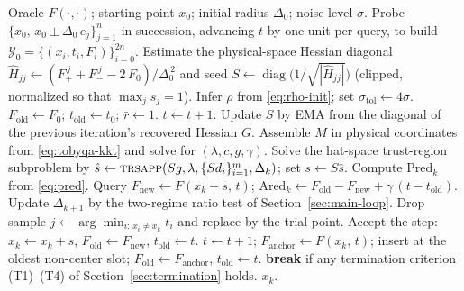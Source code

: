 \documentclass[11pt,a4paper]{article}
\begin{document}
\begin{algorithm}[t]
\caption{TOBYQA}
\label{alg:tobyqa}
\begin{algorithmic}[1]
\REQUIRE Oracle $F(\cdot,\cdot)$; starting point $x_0$;
         initial radius $\Delta_0$; noise level $\sigma$.
\STATE Probe $\{x_0,\,x_0 \pm \Delta_0\,e_j\}_{j=1}^n$ in succession,
       advancing $t$ by one unit per query, to build
       $\mathcal{Y}_0 = \{(x_i, t_i, F_i)\}_{i=0}^{2n}$.
\STATE Estimate the physical-space Hessian diagonal
       $\widehat{H}_{jj} \leftarrow
       (F_+^{\,j} + F_-^{\,j} - 2\,F_0)/\Delta_0^{\,2}$
       and seed
       $S \leftarrow \operatorname{diag}\!\bigl(1/\sqrt{|\widehat{H}_{jj}|}\bigr)$
       (clipped, normalized so that $\max_j s_j = 1$).
\STATE Infer $\rho$ from \eqref{eq:rho-init};
       set $\sigma_{\mathrm{tol}} \leftarrow 4\sigma$.
\STATE $F_{\mathrm{old}} \leftarrow F_0$;\;
       $t_{\mathrm{old}} \leftarrow t_0$;\;
       $\bar r \leftarrow 1$.
  \STATE $t \leftarrow t + 1$.
  \STATE Update $S$ by EMA from the diagonal of the previous
         iteration's recovered Hessian $G$.
  \STATE Assemble $M$ in physical coordinates from
         \eqref{eq:tobyqa-kkt} and solve for
         $(\lambda, c, g, \gamma)$.
  \STATE Solve the hat-space trust-region subproblem by
         $\hat s \leftarrow \textsc{trsapp}(S g, \lambda,
         \{S d_i\}_{i=1}^{m}, \Delta_k)$;
         set $s \leftarrow S \hat s$.
  \STATE Compute $\mathrm{Pred}_k$ from \eqref{eq:pred}.
  \STATE Query $F_{\mathrm{new}} \leftarrow F(x_k + s,\, t)$;
         $\mathrm{Ared}_k \leftarrow
         F_{\mathrm{old}} - F_{\mathrm{new}}
         + \gamma\,(t - t_{\mathrm{old}})$.
  \STATE Update $\Delta_{k+1}$ by the two-regime ratio test of
         Section~\ref{sec:main-loop}.
  \STATE Drop sample
         $j \leftarrow \arg\min_{i:\,x_i \neq x_k} t_i$
         and replace by the trial point.
    \STATE Accept the step: $x_k \leftarrow x_k + s$,
           $F_{\mathrm{old}} \leftarrow F_{\mathrm{new}}$,
           $t_{\mathrm{old}} \leftarrow t$.
    \STATE $t \leftarrow t + 1$;
           $F_{\mathrm{anchor}} \leftarrow F(x_k,\, t)$;
           insert at the oldest non-center slot;
           $F_{\mathrm{old}} \leftarrow F_{\mathrm{anchor}}$,
           $t_{\mathrm{old}} \leftarrow t$.
  \ENDIF
  \STATE \textbf{break} if any termination criterion
         (T1)--(T4) of Section~\ref{sec:termination} holds.
\ENDFOR
\RETURN $x_k$.
\end{algorithmic}
\end{algorithm}
\end{document}
